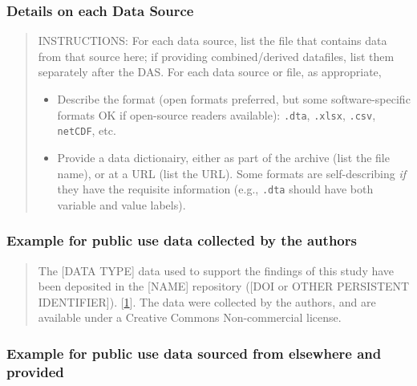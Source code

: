 \documentclass[
]{article}
\providecommand{\tightlist}{%
  \setlength{\itemsep}{0pt}\setlength{\parskip}{0pt}}
\begin{document}
\hypertarget{details-on-each-data-source}{%
\subsubsection{Details on each Data
Source}\label{details-on-each-data-source}}

\begin{quote}
INSTRUCTIONS: For each data source, list the file that contains data
from that source here; if providing combined/derived datafiles, list
them separately after the DAS. For each data source or file, as
appropriate,

\begin{itemize}
\tightlist
\item
  Describe the format (open formats preferred, but some
  software-specific formats OK if open-source readers available):
  \texttt{.dta}, \texttt{.xlsx}, \texttt{.csv}, \texttt{netCDF}, etc.
\item
  Provide a data dictionairy, either as part of the archive (list the
  file name), or at a URL (list the URL). Some formats are
  self-describing \emph{if} they have the requisite information (e.g.,
  \texttt{.dta} should have both variable and value labels).
\end{itemize}
\end{quote}

\hypertarget{example-for-public-use-data-collected-by-the-authors}{%
\subsubsection{Example for public use data collected by the
authors}\label{example-for-public-use-data-collected-by-the-authors}}

\begin{quote}
The {[}DATA TYPE{]} data used to support the findings of this study have
been deposited in the {[}NAME{]} repository ({[}DOI or OTHER PERSISTENT
IDENTIFIER{]}).
{[}\href{https://www.hindawi.com/research.data/\#statement.templates}{1}{]}.
The data were collected by the authors, and are available under a
Creative Commons Non-commercial license.
\end{quote}

\hypertarget{example-for-public-use-data-sourced-from-elsewhere-and-provided}{%
\subsubsection{Example for public use data sourced from elsewhere and
provided}\label{example-for-public-use-data-sourced-from-elsewhere-and-provided}}
\end{document}

